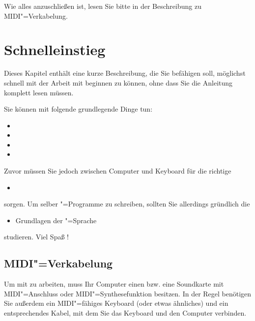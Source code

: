 Wie alles anzuschließen ist, lesen Sie bitte in der Beschreibung 
zu MIDI"=Verkabelung.




\chapter{Schnelleinstieg}\label{sec:CC_BASICS}

Dieses Kapitel enthält eine kurze Beschreibung, die Sie befähigen
soll, möglichst schnell mit der Arbeit mit \mutabor{} beginnen zu
können, ohne dass Sie die Anleitung komplett lesen müssen.

Sie können mit \mutabor{} folgende grundlegende Dinge tun:

\begin{itemize}
\item {}
\item {}
\item {}
\item {}
\end{itemize}

Zuvor müssen Sie jedoch zwischen Computer und Keyboard für 
die richtige

\begin{itemize}
\item {}
\end{itemize}

sorgen. Um selber \mutabor{}"=Programme zu schreiben, sollten 
Sie allerdings gründlich die


\begin{itemize}
\item Grundlagen der \mutabor{}"=Sprache
\end{itemize}

studieren. Viel Spaß !


\section{MIDI"=Verkabelung}\label{sec:CC_CABLE}

Um mit \mutabor{} zu arbeiten, muss Ihr Computer einen  
bzw. eine Soundkarte mit MIDI"=Anschluss oder MIDI"=Synthesefunktion 
besitzen. In der Regel benötigen Sie außerdem ein MIDI"=fähiges 
Keyboard (oder etwas ähnliches) und ein entsprechendes Kabel, 
mit dem Sie das Keyboard und den Computer verbinden.

